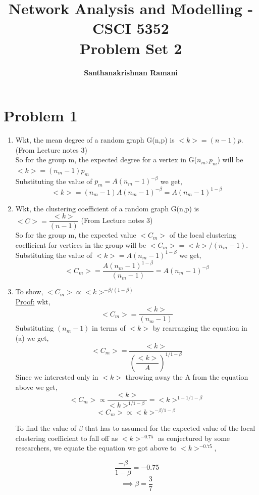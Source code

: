 \documentclass{article}
\date{\displaydate{date}}
\title{\textbf{Network Analysis and Modelling - CSCI 5352} \\
Problem Set 2}
\author{\textbf{Santhanakrishnan Ramani}}
\begin{document}
\maketitle

\section*{Problem 1}
\begin{enumerate}[label=(\alph*)]
\item
Wkt, the mean degree of a random graph G(n,p) is $<k> = (n-1)p$. (From Lecture notes 3)\\
So for the group m, the expected degree for a vertex in G($n_m,p_m$) will be $<k> = (n_m-1)p_m$\\
Substituting the value of $p_m = A(n_m-1)^{-\beta}$ we get,$$<k> = (n_m-1)A(n_m-1)^{-\beta} = A(n_m-1)^{1-\beta}$$
 
\item
Wkt, the clustering coefficient of a random graph G(n,p) is $<C>=\dfrac{<k>}{(n-1)}$ (From Lecture notes 3)\\
So for the group m, the expected value $<C_m>$ of the local clustering coefficient for vertices in the group will be $<C_m> = <k>/(n_m-1)$. Substituting the value of $<k> = A(n_m-1)^{1-\beta}$ we get,
$$<C_m> = \dfrac{A(n_m-1)^{1-\beta}}{(n_m-1)} = A(n_m-1)^{-\beta}$$

\item
To show, $<C_m> \propto <k>^{{-\beta}/(1-\beta)}$\\
\underline{Proof:}
wkt,
$$<C_m> = \dfrac{<k>}{(n_m-1)}$$
Substituting $(n_m-1)$ in terms of $<k>$ by rearranging the equation in (a) we get,
$$<C_m> = \dfrac{<k>}{(\dfrac{<k>}{A})^{1/1-\beta}}$$
Since we interested only in $<k>$ throwing away the A from the equation above we get,
$$<C_m> \propto \dfrac{<k>}{<k>^{1/1-\beta}} = <k>^{1-1/1-\beta}$$
$$<C_m> \propto <k>^{-\beta/1-\beta}$$

To find the value of $\beta$ that has to assumed for the expected value of the local clustering coefficient to fall off as $<k>^{-0.75}$ as conjectured by some researchers, we equate the equation we got above to $<k>^{-0.75}$,

$$\dfrac{-\beta}{1-\beta} = -0.75$$
$$ \implies \beta = \dfrac{3}{7} $$
\end{enumerate}
\end{document}
